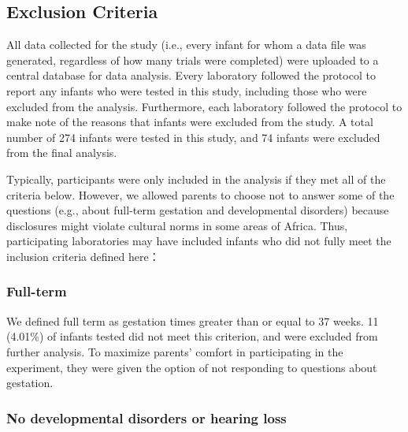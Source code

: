 \documentclass[
  english,
  ,man,floatsintext]{apa6}
\begin{document}
\subsection{Exclusion Criteria}\label{exclusion-criteria}

All data collected for the study (i.e., every infant for whom a data file was generated, regardless of how many trials were completed) were uploaded to a central database for data analysis. Every laboratory followed the protocol to report any infants who were tested in this study, including those who were excluded from the analysis. Furthermore, each laboratory followed the protocol to make note of the reasons that infants were excluded from the study. A total number of 274 infants were tested in this study, and 74 infants were excluded from the final analysis.

Typically, participants were only included in the analysis if they met all of the criteria below. However, we allowed parents to choose not to answer some of the questions (e.g., about full-term gestation and developmental disorders) because disclosures might violate cultural norms in some areas of Africa. Thus, participating laboratories may have included infants who did not fully meet the inclusion criteria defined here：

\subsubsection{Full-term}\label{full-term}

We defined full term as gestation times greater than or equal to 37 weeks. 11 (4.01\%) of infants tested did not meet this criterion, and were excluded from further analysis. To maximize parents' comfort in participating in the experiment, they were given the option of not responding to questions about gestation.

\subsubsection{No developmental disorders or hearing loss}\label{no-developmental-disorders-or-hearing-loss}
\end{document}
